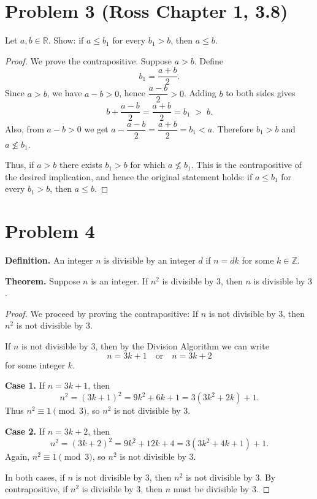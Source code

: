 \documentclass[12pt]{article}
\begin{document}
\section*{Problem 3 (Ross Chapter 1, 3.8)}
Let $a,b\in\mathbb{R}$. Show: if $a\le b_1$ for every $b_1>b$, then $a\le b$.

\begin{proof}
We prove the contrapositive. Suppose $a>b$. Define
\[
b_1=\frac{a+b}{2}.
\]
Since $a>b$, we have $a-b>0$, hence $\dfrac{a-b}{2}>0$. Adding $b$ to both sides gives
\[
b+\frac{a-b}{2}=\frac{a+b}{2}=b_1 \;>\; b.
\]
Also, from $a-b>0$ we get $a-\dfrac{a-b}{2}=\dfrac{a+b}{2}=b_1<a$. Therefore $b_1>b$ and $a\not\le b_1$.

Thus, if $a>b$ there exists $b_1>b$ for which $a\not\le b_1$. This is the contrapositive of the desired implication, and hence the original statement holds: if $a\le b_1$ for every $b_1>b$, then $a\le b$.
\end{proof}

\section*{Problem 4}

\textbf{Definition.} An integer $n$ is divisible by an integer $d$ if $n = dk$ for some $k \in \mathbb{Z}$.

\medskip
\textbf{Theorem.} Suppose $n$ is an integer. If $n^2$ is divisible by $3$, then $n$ is divisible by $3$.

\begin{proof}
We proceed by proving the contrapositive: If $n$ is not divisible by $3$, then $n^2$ is not divisible by $3$.

If $n$ is not divisible by $3$, then by the Division Algorithm we can write
\[
n = 3k+1 \quad \text{or} \quad n = 3k+2
\]
for some integer $k$.

\textbf{Case 1.} If $n = 3k+1$, then
\[
n^2 = (3k+1)^2 = 9k^2 + 6k + 1 = 3(3k^2 + 2k) + 1.
\]
Thus $n^2 \equiv 1 \pmod{3}$, so $n^2$ is not divisible by $3$.

\textbf{Case 2.} If $n = 3k+2$, then
\[
n^2 = (3k+2)^2 = 9k^2 + 12k + 4 = 3(3k^2 + 4k + 1) + 1.
\]
Again, $n^2 \equiv 1 \pmod{3}$, so $n^2$ is not divisible by $3$.

\medskip
In both cases, if $n$ is not divisible by $3$, then $n^2$ is not divisible by $3$. By contrapositive, if $n^2$ is divisible by $3$, then $n$ must be divisible by $3$.
\end{proof}
\end{document}
